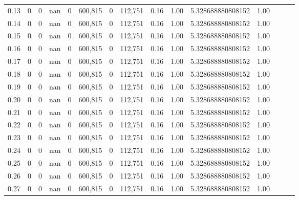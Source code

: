 \begin{tabular}{rrrrrrrrrrrrrrr}
0.13 &        0 &        0 &   nan &        0 &  600,815 &        0 &  112,751 &  0.16 &  1.00 &     5.328688880808152 &      1.00 \\
0.14 &        0 &        0 &   nan &        0 &  600,815 &        0 &  112,751 &  0.16 &  1.00 &     5.328688880808152 &      1.00 \\
0.15 &        0 &        0 &   nan &        0 &  600,815 &        0 &  112,751 &  0.16 &  1.00 &     5.328688880808152 &      1.00 \\
0.16 &        0 &        0 &   nan &        0 &  600,815 &        0 &  112,751 &  0.16 &  1.00 &     5.328688880808152 &      1.00 \\
0.17 &        0 &        0 &   nan &        0 &  600,815 &        0 &  112,751 &  0.16 &  1.00 &     5.328688880808152 &      1.00 \\
0.18 &        0 &        0 &   nan &        0 &  600,815 &        0 &  112,751 &  0.16 &  1.00 &     5.328688880808152 &      1.00 \\
0.19 &        0 &        0 &   nan &        0 &  600,815 &        0 &  112,751 &  0.16 &  1.00 &     5.328688880808152 &      1.00 \\
0.20 &        0 &        0 &   nan &        0 &  600,815 &        0 &  112,751 &  0.16 &  1.00 &     5.328688880808152 &      1.00 \\
0.21 &        0 &        0 &   nan &        0 &  600,815 &        0 &  112,751 &  0.16 &  1.00 &     5.328688880808152 &      1.00 \\
0.22 &        0 &        0 &   nan &        0 &  600,815 &        0 &  112,751 &  0.16 &  1.00 &     5.328688880808152 &      1.00 \\
0.23 &        0 &        0 &   nan &        0 &  600,815 &        0 &  112,751 &  0.16 &  1.00 &     5.328688880808152 &      1.00 \\
0.24 &        0 &        0 &   nan &        0 &  600,815 &        0 &  112,751 &  0.16 &  1.00 &     5.328688880808152 &      1.00 \\
0.25 &        0 &        0 &   nan &        0 &  600,815 &        0 &  112,751 &  0.16 &  1.00 &     5.328688880808152 &      1.00 \\
0.26 &        0 &        0 &   nan &        0 &  600,815 &        0 &  112,751 &  0.16 &  1.00 &     5.328688880808152 &      1.00 \\
0.27 &        0 &        0 &   nan &        0 &  600,815 &        0 &  112,751 &  0.16 &  1.00 &     5.328688880808152 &      1.00 \\

\end{tabular}
